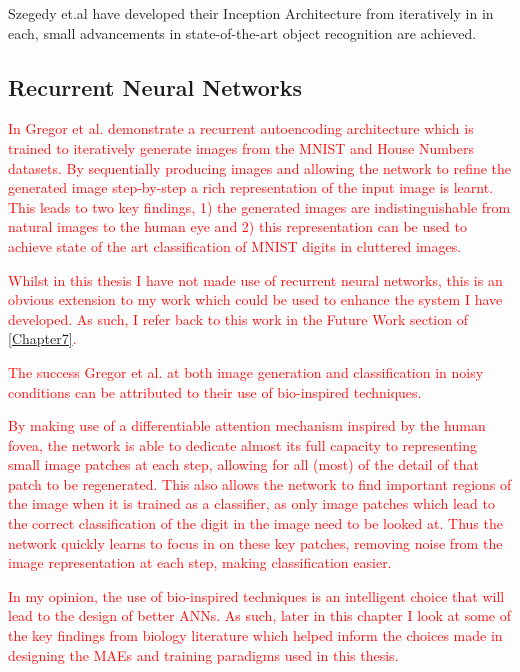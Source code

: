 Szegedy et.al have developed their Inception Architecture from \cite{szegedy2015going} iteratively in \cite{szegedy2016rethinking, szegedy2017inception} in each, small advancements in state-of-the-art object recognition are achieved.

\subsection{Recurrent Neural Networks}
\textcolor{red}{In \cite{gregor2015draw} Gregor et al. demonstrate a recurrent autoencoding architecture which is trained to iteratively generate images from the MNIST \cite{lecun1998mnist} and House Numbers \cite{netzer2011reading} datasets. By sequentially producing images and allowing the network to refine the generated image step-by-step a rich representation of the input image is learnt. This leads to two key findings, 1) the generated images are indistinguishable from natural images to the human eye and 2) this representation can be used to achieve state of the art classification of MNIST digits in cluttered images.}

\textcolor{red}{ Whilst in this thesis I have not made use of recurrent neural networks, this is an obvious extension to my work which could be used to enhance the system I have developed. As such, I refer back to this work in the Future Work section of \autoref{Chapter7}.}

\textcolor{red}{The success Gregor et al. at both image generation and classification in noisy conditions can be attributed to their use of bio-inspired techniques.}

\textcolor{red}{By making use of a differentiable attention mechanism inspired by the human fovea, the network is able to dedicate almost its full capacity to representing small image patches at each step, allowing for all (most) of the detail of that patch to be regenerated. This also allows the network to find important regions of the image when it is trained as a classifier, as only image patches which lead to the correct classification of the digit in the image need to be looked at. Thus the network quickly learns to focus in on these key patches, removing noise from the image representation at each step, making classification easier.}

\textcolor{red}{In my opinion, the use of bio-inspired techniques is an intelligent choice that will lead to the design of better \acp{ANN}. As such, later in this chapter I look at some of the key findings from biology literature which helped inform the choices made in designing the \acp{MAE} and training paradigms used in this thesis.} 


